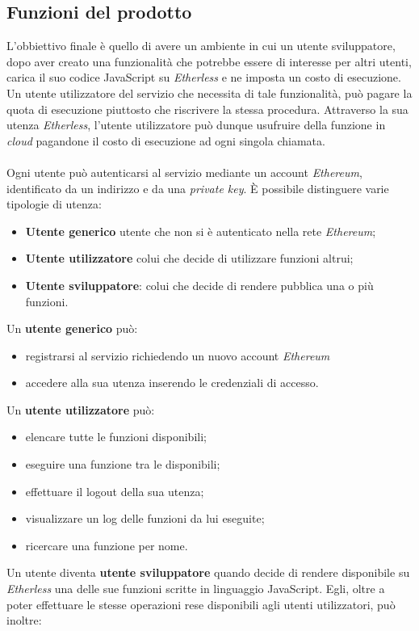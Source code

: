 \subsection{Funzioni del prodotto}
L'obbiettivo finale è quello di avere un ambiente in cui un utente sviluppatore, dopo aver creato una funzionalità che potrebbe essere di interesse per altri utenti, carica il suo codice JavaScript su \textit{Etherless} e ne imposta un costo di esecuzione. Un utente utilizzatore del servizio che necessita di tale funzionalità, può pagare la quota di esecuzione piuttosto che riscrivere la stessa procedura. Attraverso la sua utenza \textit{Etherless}, l'utente utilizzatore può dunque usufruire della funzione in \textit{cloud\glo} pagandone il costo di esecuzione ad ogni singola chiamata.
\\\\
Ogni utente può autenticarsi al servizio mediante un account \textit{Ethereum\glo}, identificato da un indirizzo e da una \textit{private key\glos}. È possibile distinguere varie tipologie di utenza:
\begin{itemize}
	\item \textbf{Utente generico} utente che non si è autenticato nella rete \textit{Ethereum\glos};
	\item \textbf{Utente utilizzatore} colui che decide di utilizzare funzioni altrui;
	\item \textbf{Utente sviluppatore}: colui che decide di rendere pubblica una o più funzioni.
\end{itemize} 
Un \textbf{utente generico} può:
\begin{itemize}
	\item registrarsi al servizio richiedendo un nuovo account \textit{Ethereum\glos}
	\item accedere alla sua utenza inserendo le credenziali di accesso.
\end{itemize}
Un \textbf{utente utilizzatore} può:
\begin{itemize}
	\item elencare tutte le funzioni disponibili;
	\item eseguire una funzione tra le disponibili;
	\item effettuare il logout della sua utenza;
	\item visualizzare un log delle funzioni da lui eseguite;
	\item ricercare una funzione per nome.
\end{itemize}
Un utente diventa \textbf{utente sviluppatore} quando decide di rendere disponibile su \textit{Etherless} una delle sue funzioni scritte in linguaggio JavaScript. Egli, oltre a poter effettuare le stesse operazioni rese disponibili agli utenti utilizzatori, può inoltre:
